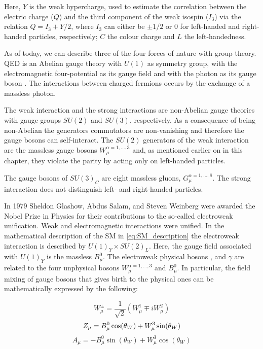 				\noindent Here, $Y$ is the weak hypercharge, used to estimate the correlation between the electric charge ($Q$) and the third component of the weak isospin ($I_3$) via the relation $Q = I_3 + Y/2$, where $I_3$ can either be $\pm 1/2$ or $0$ for left-handed and right-handed particles, respectively; $C$ the colour charge and $L$ the left-handedness. 

				As of today, we can describe three of the four forces of nature with group theory. QED is an Abelian gauge theory with $U(1)$ as symmetry group, with the electromagnetic four-potential as its gauge field and with the photon as its gauge boson \cite{Pich2012}. The interactions between charged fermions occurs by the exchange of a massless photon. 

				The weak interaction and the strong interactions are non-Abelian gauge theories with gauge groups $SU(2)$ and $SU(3)$, respectively. As a consequence of being non-Abelian the generators commutators are non-vanishing and therefore the gauge bosons can self-interact. The $SU(2)$ generators of the weak interaction are the massless gauge bosons $W_{\mu}^{\alpha = 1,\dots,3}$ and, as mentioned earlier on in this chapter, they violate the parity by acting only on left-handed particles. 

				The gauge bosons of $SU(3)_C$ are eight massless gluons, $G_{\mu}^{\alpha=1,\dots,8}$. The strong interaction does not distinguish left- and right-handed particles. 

				In 1979 Sheldon Glashow, Abdus Salam, and Steven Weinberg were awarded the Nobel Prize in Physics for their contributions to the so-called electroweak unification. Weak and electromagnetic interactions were unified. In the mathematical description of the SM in \ref{eq:SM_description} the electroweak interaction is described by $U(1)_Y \times SU(2)_L$. Here, the gauge field associated with $U(1)_Y$ is the massless $B_\mu^0$. The electroweak physical bosons \Wboson, \Zboson and $\gamma$ are related to the four unphysical bosons $W_{\mu}^{\alpha = 1,\dots,3}$ and $B_\mu^0$. In particular, the field mixing of gauge bosons that gives birth to the physical ones can be mathematically expressed by the following: 

				\begin{equation}
					W_{\mu}^\pm = \frac{1}{\sqrt{2}} \displaystyle \left ( W_{\mu}^1 \mp i W_{\mu}^2 \right )
				\end{equation}
				\begin{equation}
					Z_{\mu} = B_{\mu}^0 \cos(\theta_W) + W_{\mu}^3 \sin (\theta_W) \\
				\end{equation}
				\begin{equation}
					A_{\mu} = - B_{\mu}^0 \sin(\theta_W) + W_{\mu}^3 \cos (\theta_W)
				\end{equation}

